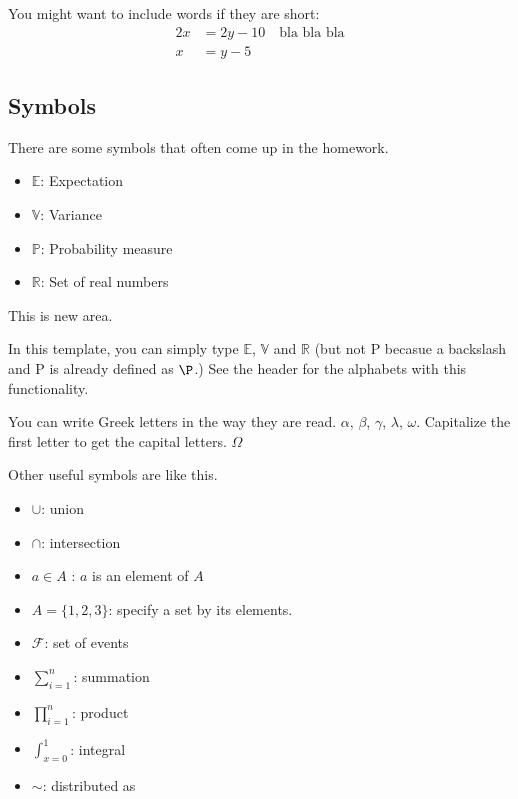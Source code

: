 \documentclass[11pt]{article}
\theoremstyle{quest}
\newcommand{\R}{\mathbb{R}}
\newcommand{\E}{\mathbb{E}}
\newcommand{\V}{\mathbb{V}}
\begin{document}
You might want to include words if they are short:
\begin{equation}
\begin{split}
  2x &= 2y-10 \quad \text{bla bla bla}\\
  x &=y -5  
\end{split}
\end{equation}


\subsection{Symbols}

There are some symbols that often come up in the homework. \\
\begin{itemize}
    \item $\mathbb{E}$: Expectation  
    \item $\mathbb{V}$: Variance
    \item $\mathbb{P}$: Probability measure
    \item $\mathbb{R}$: Set of real numbers
\end{itemize}
This is new area.

In this template, you can simply type $\E$, $\V$ and $\R$ (but not P becasue a backslash and P is already defined as $\P$.) 
See the header for the alphabets with this functionality. 

You can write Greek letters in the way they are read. $\alpha$, $\beta$, $\gamma$, 
$\lambda$, $\omega$. Capitalize the first letter to get the capital letters. $\Omega$

Other useful symbols are like this. 
\begin{itemize}
    \item $\cup$: union
    \item $\cap$: intersection
    \item $a \in A$ : $a$ is an element of $A$
    \item $A = \{1, 2, 3\}$: specify a set by its elements. 
    \item $\mathcal{F}$: set of events
    \item $\sum_{i=1}^n$: summation 
    \item $\prod_{i=1}^n$: product 
    \item $\int_{x=0}^1$: integral 
    \item $\sim$: distributed as 
\end{itemize}
\end{document}
